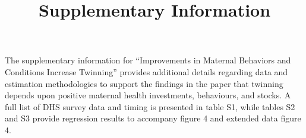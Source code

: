 \documentclass{nature}
\title{Supplementary Information}
\begin{document}
\maketitle

\begin{linenumbers}

The supplementary information for ``Improvements in Maternal Behaviors and Conditions Increase Twinning'' provides additional details regarding data and estimation methodologies to support the findings in the paper that twinning depends upon positive maternal health investments, behaviours, and stocks.  A full list of DHS survey data and timing is presented in table S1, while tables S2 and S3 provide regression results to accompany figure 4 and extended data figure 4.


%
%
%


\clearpage
\begin{spacing}{1}

\begin{landscape}

\end{landscape}
\begin{landscape}

\end{landscape}
\end{spacing}



\end{linenumbers}
\end{document}
